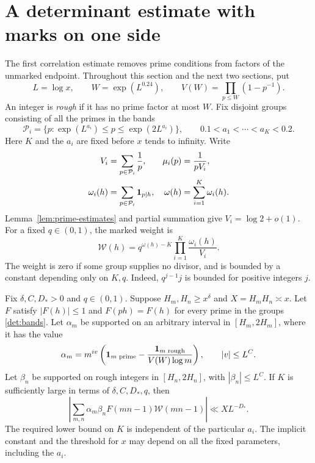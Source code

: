 \section{A determinant estimate with marks on one side}
\label{det:section}
\label{sec:determinant}

The first correlation estimate removes prime conditions from factors of
the unmarked endpoint.  Throughout this section and the next two sections,
put
\begin{equation}\label{det:parameters}
 L=\log x,\qquad W=\exp(L^{0.24}),\qquad
 V(W)=\prod_{p\leq W}(1-p^{-1}).
\end{equation}
An integer is \emph{rough} if it has no prime factor at most $W$.
Fix disjoint groups consisting of all the primes in the bands
\begin{equation}\label{det:bands}
 \mathcal P_i=\{p:\exp(L^{a_i})\leq p\leq\exp(2L^{a_i})\},
 \qquad 0.1<a_1<\cdots<a_K<0.2.
\end{equation}
Here $K$ and the $a_i$ are fixed before $x$ tends to infinity.  Write
\begin{equation}\label{det:marks}
 \begin{aligned}
 V_i&=\sum_{p\in\mathcal P_i}\frac1p,
 &\mu_i(p)&=\frac1{pV_i},\\
 \omega_i(h)&=\sum_{p\in\mathcal P_i}\mathbf{1}_{p\mid h},
 &\omega(h)&=\sum_{i=1}^K\omega_i(h).
 \end{aligned}
\end{equation}
Lemma~\ref{lem:prime-estimates} and partial summation give
$V_i=\log 2+o(1)$.  For a fixed $q\in(0,1)$, the marked weight is
\begin{equation}\label{det:weight}
 \mathcal W(h)=q^{\omega(h)-K}
       \prod_{i=1}^K\frac{\omega_i(h)}{V_i}.
\end{equation}
The weight is zero if some group supplies no divisor, and is bounded by
a constant depending only on $K,q$.  Indeed, $q^{j-1}j$ is bounded for
positive integers $j$.

\begin{theorem}\label{thm:type-II}
Fix $\delta,C,D_*>0$ and $q\in(0,1)$.  Suppose
$H_m,H_n\geq x^\delta$ and $X=H_mH_n\asymp x$.  Let $F$ satisfy
$|F(h)|\leq1$ and $F(ph)=F(h)$ for every prime in the groups
\eqref{det:bands}.  Let $\alpha_m$ be supported on an arbitrary
interval in $[H_m,2H_m]$, where it has the value
\[
 \alpha_m=m^{iv}\left(\mathbf{1}_{m\text{ prime}}
       -\frac{\mathbf{1}_{m\text{ rough}}}{V(W)\log m}\right),
 \qquad |v|\leq L^C.
\]
Let $\beta_n$ be supported on rough integers in $[H_n,2H_n]$, with
$|\beta_n|\leq L^C$.  If $K$ is sufficiently large in terms of
$\delta,C,D_*,q$, then
\begin{equation}\label{eq:type-II}
 \left|\sum_{m,n}\alpha_m\beta_n F(mn-1)\mathcal W(mn-1)\right|
       \ll X L^{-D_*}.
\end{equation}
The required lower bound on $K$ is independent of the particular
$a_i$.  The implicit constant and the threshold for $x$ may depend on
all the fixed parameters, including the $a_i$.
\end{theorem}

